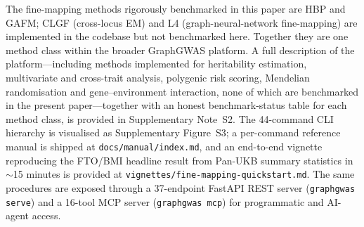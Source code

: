 The fine-mapping methods rigorously benchmarked in this paper are
HBP and GAFM; CLGF (cross-locus EM) and L4 (graph-neural-network
fine-mapping) are implemented in the codebase but not benchmarked
here. Together they are one method class within the broader
GraphGWAS platform.
A full description of the platform---including methods implemented
for heritability estimation, multivariate and cross-trait analysis,
polygenic risk scoring, Mendelian randomisation and
gene--environment interaction, none of which are benchmarked in
the present paper---together with an honest benchmark-status table
for each method class, is provided in Supplementary Note~S2. The
44-command CLI hierarchy is visualised as Supplementary
Figure~S3; a per-command reference manual is shipped at
\texttt{docs/manual/index.md}, and an end-to-end vignette
reproducing the FTO/BMI headline result from Pan-UKB summary
statistics in $\sim$15 minutes is provided at
\texttt{vignettes/fine-mapping-quickstart.md}. The same procedures
are exposed through a 37-endpoint FastAPI REST server
(\texttt{graphgwas serve}) and a 16-tool MCP server
(\texttt{graphgwas mcp}) for programmatic and AI-agent access.
